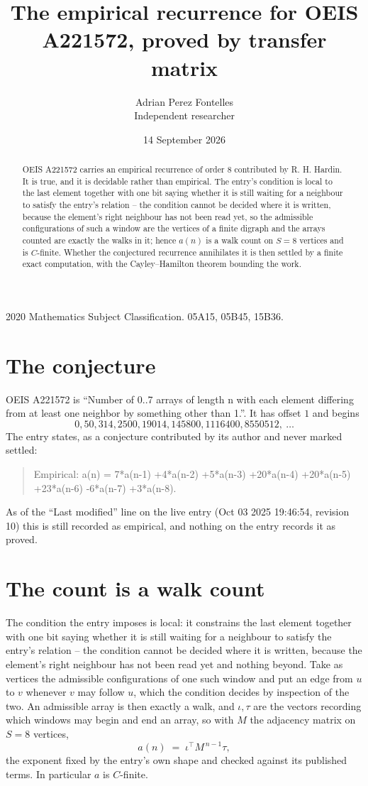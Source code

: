 \documentclass[11pt,a4paper]{article}
\title{The empirical recurrence for OEIS A221572, proved by transfer matrix}
\author{Adrian Perez Fontelles\\ \small Independent researcher}
\date{14 September 2026}
\theoremstyle{plain}
\theoremstyle{definition}
\begin{document}
\maketitle

\begin{abstract}
OEIS A221572 carries an empirical recurrence of order $8$ contributed by R. H. Hardin. It is
true, and it is decidable rather than empirical. The entry's condition is local to the last element together with one bit saying whether it is still waiting for a neighbour to satisfy the entry's relation -- the condition cannot be decided where it is written, because the element's right neighbour has not been read yet, so
the admissible configurations of such a window are the vertices of a finite digraph and the
arrays counted are exactly the walks in it; hence $a(n)$ is a walk count on $S=8$ vertices
and is $C$-finite. Whether the conjectured recurrence annihilates it is then settled by a
finite exact computation, with the Cayley--Hamilton theorem bounding the work.
\end{abstract}

\noindent\small 2020 Mathematics Subject Classification. 05A15, 05B45, 15B36.\normalsize

\section{The conjecture}

OEIS A221572 is ``Number of 0..7 arrays of length n with each element differing from at least one neighbor by something other than 1.''. It has offset $1$ and begins
\[
0, 50, 314, 2500, 19014, 145800, 1116400, 8550512,\ \dots
\]
The entry states, as a conjecture contributed by its author and never marked settled:
\begin{quote}
Empirical: a(n) = 7*a(n-1) +4*a(n-2) +5*a(n-3) +20*a(n-4) +20*a(n-5) +23*a(n-6) -6*a(n-7) +3*a(n-8).
\end{quote}
As of the ``Last modified'' line on the live entry (Oct 03 2025 19:46:54, revision 10) this is still
recorded as empirical, and nothing on the entry records it as proved.

\section{The count is a walk count}

The condition the entry imposes is local: it constrains the last element together with one bit saying whether it is still waiting for a neighbour to satisfy the entry's relation -- the condition cannot be decided where it is written, because the element's right neighbour has not been read yet and nothing beyond. Take as vertices the admissible configurations of one such window and put an edge from $u$ to $v$ whenever $v$ may follow $u$, which the condition decides by inspection of the two.
An admissible array is then exactly a walk, and $\iota,\tau$ are the vectors recording which windows may begin and end an array, so with $M$ the adjacency matrix on $S=8$ vertices,
\[
a(n)\;=\;\iota^{\!\top}M^{\,n-1}\tau ,
\]
the exponent fixed by the entry's own shape and checked against its published terms. In
particular $a$ is $C$-finite.
\end{document}
